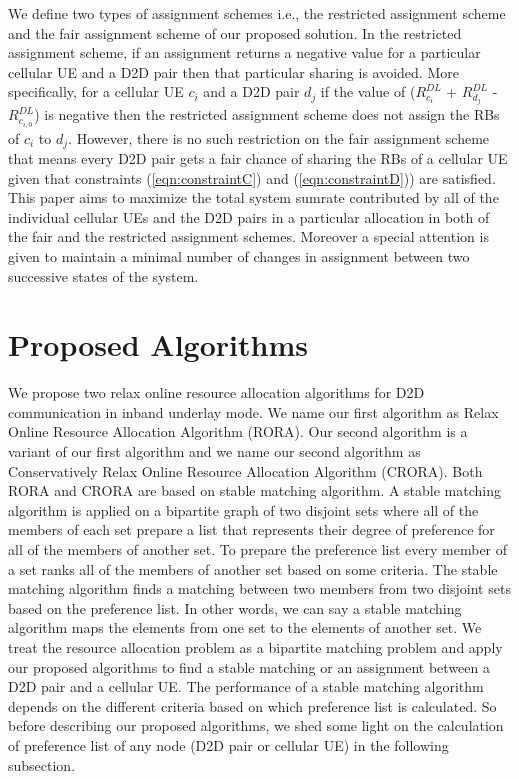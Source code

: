 \documentclass[times]{dacauth}
\begin{document}
\smallskip
\noindent
We define two types of assignment schemes i.e., the restricted assignment scheme and the fair assignment scheme of our proposed solution. In the restricted assignment scheme, if an assignment returns a negative value for a particular cellular UE and a D2D pair then that particular sharing is avoided. More specifically, for a cellular UE $c_i$ and a D2D pair $d_j$ if the value of ($R_{c_i}^{DL}$ + $R_{d_j}^{DL}$ - $R_{c_{i,0}}^{DL}$) is negative then the restricted assignment scheme does not assign the RBs of $c_i$ to $d_j$. However, there is no such restriction on the fair assignment scheme that means every D2D pair gets a fair chance of sharing the RBs of a cellular UE given that constraints (\ref{eqn:constraintC}) and (\ref{eqn:constraintD})) are satisfied. This paper aims to maximize the total system sumrate contributed by all of the individual cellular UEs and the D2D pairs in a particular allocation in both of the fair and the restricted assignment schemes. Moreover a special attention is given to maintain a minimal number of changes in assignment between two successive states of the system.

\section{Proposed Algorithms}\label{section:Proposed Algorithm}

\noindent
We propose two relax online resource allocation algorithms for D2D communication in inband underlay mode. We name our first algorithm as Relax Online Resource Allocation Algorithm (RORA). Our second algorithm is a variant of our first algorithm and we name our second algorithm as Conservatively Relax Online Resource Allocation Algorithm (CRORA). Both RORA and CRORA are based on stable matching algorithm\cite{knuth1976mariages}. A stable matching algorithm is applied on a bipartite graph of two disjoint sets where all of the members of each set prepare a list that represents their degree of preference for all of the members of another set. To prepare the preference list every member of a set ranks all of the members of another set based on some criteria. The stable matching algorithm finds a matching between two members from two disjoint sets based on the preference list. In other words, we can say a stable matching algorithm maps the elements from one set to the elements of another set. We treat the resource allocation problem as a bipartite matching problem and apply our proposed algorithms to find a stable matching or an assignment between a D2D pair and a cellular UE. The performance of a stable matching algorithm depends on the different criteria based on which preference list is calculated. So before describing our proposed algorithms, we shed some light on the calculation of preference list of any node (D2D pair or cellular UE) in the following subsection.  
\end{document}
